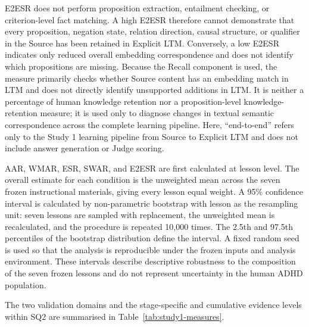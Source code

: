 E2ESR does not perform proposition extraction, entailment checking, or criterion-level fact matching. A high E2ESR therefore cannot demonstrate that every proposition, negation state, relation direction, causal structure, or qualifier in the Source has been retained in Explicit LTM. Conversely, a low E2ESR indicates only reduced overall embedding correspondence and does not identify which propositions are missing. Because the Recall component is used, the measure primarily checks whether Source content has an embedding match in LTM and does not directly identify unsupported additions in LTM. It is neither a percentage of human knowledge retention nor a proposition-level knowledge-retention measure; it is used only to diagnose changes in textual semantic correspondence across the complete learning pipeline. Here, ``end-to-end'' refers only to the Study 1 learning pipeline from Source to Explicit LTM and does not include answer generation or Judge scoring.

AAR, WMAR, ESR, SWAR, and E2ESR are first calculated at lesson level. The overall estimate for each condition is the unweighted mean across the seven frozen instructional materials, giving every lesson equal weight. A 95\% confidence interval is calculated by non-parametric bootstrap with lesson as the resampling unit: seven lessons are sampled with replacement, the unweighted mean is recalculated, and the procedure is repeated 10,000 times. The 2.5th and 97.5th percentiles of the bootstrap distribution define the interval. A fixed random seed is used so that the analysis is reproducible under the frozen inputs and analysis environment. These intervals describe descriptive robustness to the composition of the seven frozen lessons and do not represent uncertainty in the human ADHD population.

The two validation domains and the stage-specific and cumulative evidence levels within SQ2 are summarised in Table~\ref{tab:study1-measures}.


